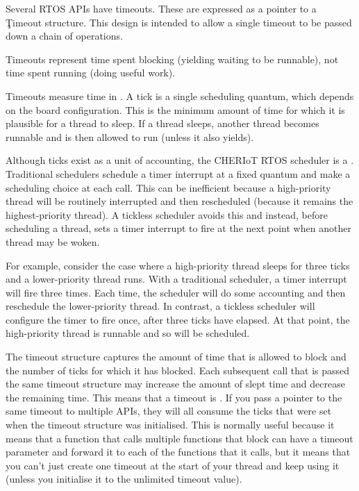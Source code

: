 Several RTOS APIs have timeouts.
These are expressed as a pointer to a \c{Timeout} structure.
This design is intended to allow a single timeout to be passed down a chain of operations.

\begin{note}
Timeouts represent time spent blocking (yielding waiting to be runnable), not time spent running (doing useful work).
\end{note}

Timeouts measure time in .
A tick is a single scheduling quantum, which depends on the board configuration.
This is the minimum amount of time for which it is plausible for a thread to sleep.
If a thread sleeps, another thread becomes runnable and is then allowed to run (unless it also yields).

Although ticks exist as a unit of accounting, the CHERIoT RTOS scheduler is a .
Traditional schedulers schedule a timer interrupt at a fixed quantum and make a scheduling choice at each call.
This can be inefficient because a high-priority thread will be routinely interrupted and then rescheduled (because it remains the highest-priority thread).
A tickless scheduler avoids this and instead, before scheduling a thread, sets a timer interrupt to fire at the next point when another thread may be woken.

For example, consider the case where a high-priority thread sleeps for three ticks and a lower-priority thread runs.
With a traditional scheduler, a timer interrupt will fire three times.
Each time, the scheduler will do some accounting and then reschedule the lower-priority thread.
In contrast, a tickless scheduler will configure the timer to fire once, after three ticks have elapsed.
At that point, the high-priority thread is runnable and so will be scheduled.

The timeout structure captures the amount of time that is allowed to block and the number of ticks for which it has blocked.
Each subsequent call that is passed the same timeout structure may increase the amount of slept time and decrease the remaining time.
This means that a timeout is .
If you pass a pointer to the same timeout to multiple APIs, they will all consume the ticks that were set when the timeout structure was initialised.
This is normally useful because it means that a function that calls multiple functions that block can have a timeout parameter and forward it to each of the functions that it calls, but it means that you can't just create one timeout at the start of your thread and keep using it (unless you initialise it to the unlimited timeout value).

